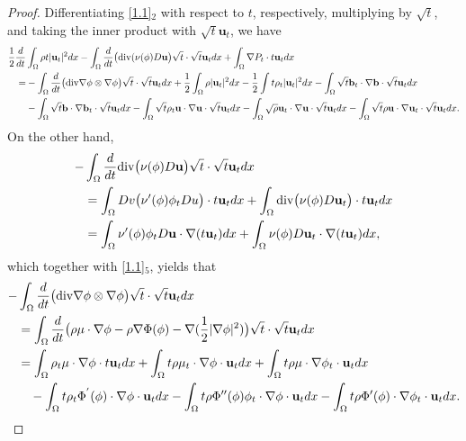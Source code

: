 \documentclass[11pt]{article}
\newcommand{\Dv}{{\rm div}}
\numberwithin{equation}{section}
\begin{document}
\begin{proof}
Differentiating \eqref{1.1}$_2$ with respect to $t$, respectively, multiplying by $\sqrt t$, and taking the inner product with $\sqrt t \mathbf{u}_t$, we have
\begin{align*}
\frac{1}{2}\frac{d}{dt}&\int_\Omega\rho t|\mathbf{u}_t|^{2}dx-\int_\Omega\frac{d}{dt}\bigl(\Dv(\nu(\phi)D\mathbf{u}\bigr)\sqrt t\cdot\sqrt t \mathbf{u}_tdx+\int_\Omega\nabla P_t\cdot t\mathbf{u}_tdx\\
=&-\int_\Omega\frac{d}{dt}\bigl(\Dv\nabla\phi\otimes\nabla\phi\bigr)\sqrt t\cdot \sqrt t \mathbf{u}_tdx+\frac{1}{2}\int_\Omega\rho |\mathbf{u}_t|^{2}dx-\frac{1}{2}\int t\rho_t|\mathbf{u}_t|^{2}dx-\int_\Omega\sqrt t \mathbf{b}_t\cdot\nabla \mathbf{b}\cdot \sqrt t \mathbf{u}_tdx\\
&-\int_\Omega\sqrt t \mathbf{b}\cdot\nabla \mathbf{b}_t\cdot \sqrt t \mathbf{u}_tdx-\int_\Omega\sqrt t\rho_t \mathbf{u}\cdot\nabla \mathbf{u}\cdot\sqrt t \mathbf{u}_tdx-\int_\Omega\sqrt\rho\mathbf{u}_t\cdot\nabla \mathbf{u}\cdot \sqrt t \mathbf{u}_tdx-\int_\Omega\sqrt t \rho \mathbf{u}\cdot\nabla \mathbf{u}_t\cdot\sqrt t \mathbf{u}_tdx.
\end{align*}
On the other hand,
\begin{align*}
-&\int_\Omega\frac{d}{dt}\Dv\bigl(\nu(\phi)D\mathbf{u}\bigr)\sqrt t\cdot\sqrt t \mathbf{u}_tdx
\ \\
&=\int_\Omega Dv\bigl(\nu'(\phi)\phi_tDu\bigr)\cdot t \mathbf{u}_tdx+\int_\Omega \Dv\bigl(\nu(\phi )D\mathbf{u}_t\bigr)\cdot t \mathbf{u}_tdx\\
&=\int_\Omega \nu'(\phi)\phi_tD\mathbf{u}\cdot \nabla(t \mathbf{u}_t)dx+\int_\Omega \nu(\phi )D\mathbf{u}_t\cdot \nabla (t \mathbf{u}_t)dx,
\end{align*}
which together with  \eqref{1.1}$_{5}$,  yields that
\begin{align*}
-&\int_\Omega\frac{d}{dt}\big(\Dv\nabla\phi\otimes\nabla\phi\big)\sqrt t\cdot \sqrt t \mathbf{u}_tdx\\&=\int_\Omega\frac{d}{dt}\bigl(\rho\mu\cdot\nabla\phi-\rho\nabla\Phi(\phi)
-\nabla(\frac{1}{2}|\nabla\phi|^2)\bigr)\sqrt t\cdot\sqrt t \mathbf{u}_tdx\\
&=\int_\Omega\rho_t\mu\cdot\nabla\phi\cdot t \mathbf{u}_tdx+\int_\Omega t\rho\mu_t\cdot\nabla\phi\cdot \mathbf{u}_tdx+
\int_\Omega t\rho\mu\cdot\nabla \phi_t\cdot\mathbf{u}_tdx\\
&\quad-\int_\Omega t\rho_t\Phi^{'}(\phi)\cdot\nabla\phi \cdot\mathbf{u}_tdx
- \int_\Omega t \rho{\Phi}''(\phi) \phi_t\cdot \nabla \phi\cdot \mathbf{u}_tdx- \int_{\Omega} t \rho \Phi'(\phi)\cdot \nabla \phi_t\cdot \mathbf{u}_tdx.

\end{align*}
\end{proof}
\end{document}
